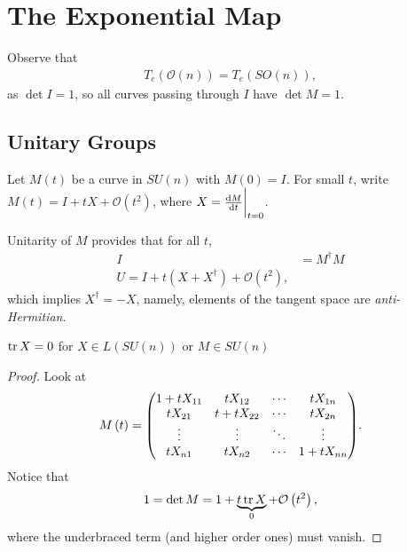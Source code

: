 
\section{The Exponential Map}



Observe that
\begin{align}
    T_e \left( \mathcal{O}\left( n \right)  \right) = T_e \left( SO \left( n \right)  \right) 
,\end{align}
as $\det I = 1$, so all curves passing through $I$ have $\det M = 1$.

\subsection{Unitary Groups}



Let $M\left( t \right) $ be a curve in $SU \left( n \right) $ with $ M \left( 0 \right) = I$. For small $t$, write $M \left( t \right) = I + t X + \mathcal{O}\left( t^2 \right) $, where $X = \dv{M}{t} \bigg|_{t=0}$. 

Unitarity of $M$ provides that for all $t$,
\begin{align}
    I &= M^{\dag} M \\
    U = I + t \left( X + X^{\dag} \right) + \mathcal{O}\left( t^2 \right) 
,\end{align}
which implies $X^{\dag} = -X$, namely, elements of the tangent space are \textit{anti-Hermitian}.

\begin{claim}
    $\tr X = 0$ for $X \in L \left( SU \left( n \right)  \right)$ or $M \in SU \left( n \right) $
\end{claim}

\begin{proof}
    Look at
    \begin{align}
        M\left( t \right) = \mqty( 1 + t X_{11} & t X_{12} & \cdots & t X_{1n} \\
        t X_{21} & t + t X_{22} & \cdots & tX_{2n} \\
        \vdots & \vdots & \ddots & \vdots \\
        t X_{n1} & t X_{n2} & \cdots & 1 + t X_{n n} )
    .\end{align}
    Notice that
    \begin{align}
        1 = \det M = 1 + \underbrace{t \tr X}_{0} + \mathcal{O} \left( t^2 \right) 
    ,\end{align}
    where the underbraced term (and higher order ones) must vanish.
\end{proof}

